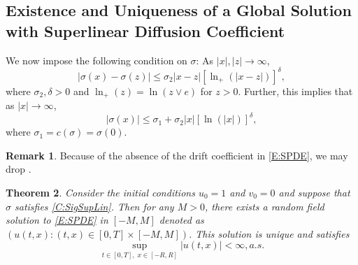 \documentclass[a4paper,11pt]{article}
\numberwithin{equation}{section}
\theoremstyle{plain}
\newtheorem{theorem}{Theorem}[section]
\theoremstyle{definition}
\newtheorem{remark}[theorem]{Remark}
\numberwithin{NQ}{section}
\numberwithin{LQ}{section}
\numberwithin{ZQ}{section}
\begin{document}
	\subsection{Existence and Uniqueness of a Global Solution with Superlinear Diffusion Coefficient}
	
	We now impose the following condition on $\sigma$: As $|x|,|z| \to \infty$,
	\begin{equation}
	\label{C:SigSupLin}
	|\sigma(x)-\sigma(z)| \le \sigma_2|x-z|[\ln_+(|x-z|)]^{\delta},
	\end{equation}
	where $\sigma_2 , \delta >0$ and $\ln_+(z) = \ln(z \vee e)$ for $z >0$. Further, this implies that as $|x| \to \infty$,
	\begin{equation}
	|\sigma(x)| \le \sigma_1 + \sigma_2|x|[\ln(|x|)]^{\delta},
	\end{equation}
	where $\sigma_1 = c(\sigma) = \sigma(0)$.
	
	\begin{remark}
		Because of the absence of the drift coefficient in \eqref{E:SPDE}, we may drop \cite[Assumption C1]{SoleMillet2021}.
	\end{remark}
	
	\begin{theorem}
		Consider the initial conditions $u_0=1$ and $v_0=0$ and suppose that $\sigma$ satisfies \eqref{C:SigSupLin}. Then for any $M>0$, there exists a random field solution to \eqref{E:SPDE} in $[-M,M]$ denoted as $(u(t,x): (t,x) \in [0,T]\times[-M,M])$. This solution is unique and satisfies 
		\begin{equation}
		\sup_{t\in[0,T],\; x\in[-R,R]} |u(t,x)| < \infty, a.s.
		\end{equation}
	\end{theorem}
	
\end{document}
